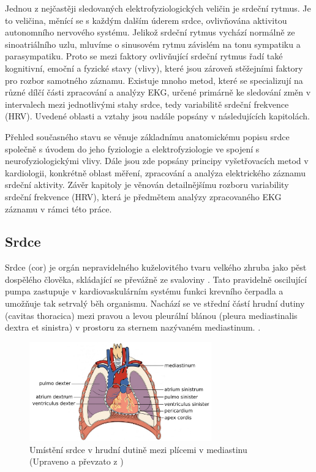 Jednou z nejčastěji sledovaných elektrofyziologických veličin je srdeční rytmus.
Je to veličina, měnící se s každým dalším úderem srdce, ovlivňována aktivitou
autonomního nervového systému. Jelikož srdeční rytmus vychází normálně ze
sinoatriálního uzlu, mluvíme o sinusovém rytmu závislém na tonu sympatiku a
parasympatiku. Proto se mezi faktory ovlivňující srdeční rytmus řadí také
kognitivní, emoční a fyzické stavy (vlivy), které jsou zároveň stěžejními
faktory pro rozbor samotného záznamu. Existuje mnoho metod, které se
specializují na různé dílčí části zpracování a analýzy EKG, určené primárně ke
sledování změn v intervalech mezi jednotlivými stahy srdce, tedy variabilitě
srdeční frekvence (HRV). Uvedené oblasti a vztahy jsou nadále popsány v
následujících kapitolách.

Přehled současného stavu se věnuje základnímu anatomickému popisu srdce společně
s úvodem do jeho fyziologie a elektrofyziologie ve spojení s neurofyziologickými
vlivy. Dále jsou zde popsány principy vyšetřovacích metod v kardiologii,
konkrétně oblast měření, zpracování a analýza elektrického záznamu srdeční
aktivity. Závěr kapitoly je věnován detailnějšímu rozboru variability srdeční
frekvence (HRV), která je předmětem analýzy zpracovaného EKG záznamu v rámci
této práce.

\subsection{Srdce}
\label{section:heart}
Srdce (cor) je orgán nepravidelného kuželovitého tvaru velkého zhruba jako pěst
dospělého člověka, skládající se převážně ze svaloviny \cite{Memorix2017}. Tato
pravidelně oscilující pumpa zastupuje v kardiovaskulárním systému funkci
krevního čerpadla a umožňuje tak setrvalý běh organismu. Nachází se ve střední
částí hrudní dutiny (cavitas thoracica) mezi pravou a levou pleurální blánou
(pleura mediastinalis dextra et sinistra) v prostoru za sternem nazývaném
mediastinum. \cite{Weinhaus2005}.

\begin{figure}[h]
	\begin{center}
		\includegraphics[width=0.7\textwidth]{../assets/anatomy/mediastinum}
		\caption{Umístění srdce v hrudní dutině mezi plícemi v mediastinu
			(Upraveno a převzato z \cite{OpenStax})}
		\label{fig:mediastinum}
	\end{center}
\end{figure}


